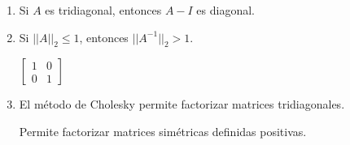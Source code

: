 \documentclass[11pt]{article}
\begin{document}
\begin{enumerate}
\begin{enumerate}
     \vspace{7mm}
    \item {} 
    \begin{minipage}{0.4\textwidth}
	Si $A$ es tridiagonal, entonces $A-I$ es diagonal.
    \end{minipage} 
    \begin{minipage}{0.4\textwidth}
    \fbox{2pt}
    \end{minipage}
     
     \vspace{7mm}
    \item {} 
    \begin{minipage}{0.4\textwidth}
	Si $||A||_2\leq 1$, entonces $||A^{-1}||_2>1$.
    \end{minipage} 
    \begin{minipage}{0.4\textwidth}
    $\begin{bmatrix}
    1 & 0\\
    0 & 1
    \end{bmatrix}$
    \end{minipage}
        
        \vspace{7mm}
    \item {} 
    \begin{minipage}{0.4\textwidth}
	El m\'etodo de Cholesky permite factorizar matrices tridiagonales.
    \end{minipage} 
    \begin{minipage}{0.4\textwidth}
    Permite factorizar matrices sim\'etricas definidas positivas.
    \end{minipage}
\end{enumerate}


\end{enumerate}
\end{document}
